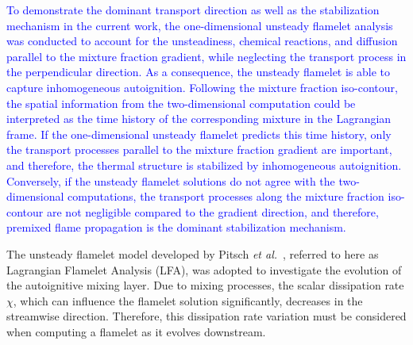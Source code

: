 \documentclass[review,3p,times]{elsarticle}
\begin{document}
\textcolor{blue}{To demonstrate the dominant transport direction as well as the stabilization mechanism in the current work, the one-dimensional unsteady flamelet analysis was conducted to account for the unsteadiness, chemical reactions, and diffusion parallel to the mixture fraction gradient, while neglecting the transport process in the perpendicular direction.  As a consequence, the unsteady flamelet is able to capture inhomogeneous autoignition.  Following the mixture fraction iso-contour, the spatial information from the two-dimensional computation could be interpreted as the time history of the corresponding mixture in the Lagrangian frame.  If the one-dimensional unsteady flamelet predicts this time history, only the transport processes parallel to the mixture fraction gradient are important, and therefore, the thermal structure is stabilized by inhomogeneous autoignition.  Conversely, if the unsteady flamelet solutions do not agree with the two-dimensional computations, the transport processes along the mixture fraction iso-contour are not negligible compared to the gradient direction, and therefore, premixed flame propagation is the dominant stabilization mechanism.}

The unsteady flamelet model developed by Pitsch \emph{et al.}~\cite{pitsch98a}, referred to here as Lagrangian Flamelet Analysis (LFA), was adopted to investigate the evolution of the autoignitive mixing layer.  Due to mixing processes, the scalar dissipation rate $\chi$, which can influence the flamelet solution significantly, decreases in the streamwise direction.  Therefore, this dissipation rate variation must be considered when computing a flamelet as it evolves downstream.
\end{document}
